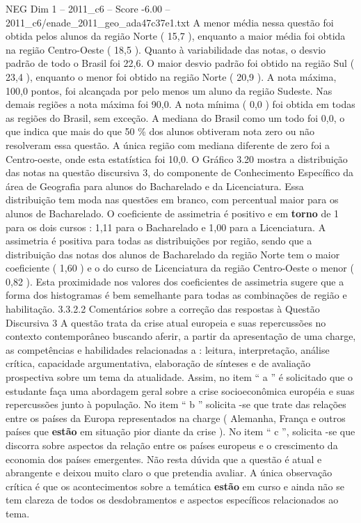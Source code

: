 \begin{textsample}{NEG Dim 1 – 2011\_c6 – Score -6.00 – 2011\_c6/enade\_2011\_geo\_ada47c37e1.txt}
A menor média nessa questão foi obtida pelos alunos da região Norte ( 15,7 ), enquanto a maior média foi obtida na região Centro-Oeste ( 18,5 ).
Quanto à variabilidade das notas, o desvio padrão de todo o Brasil foi 22,6.
O maior desvio padrão foi obtido na região Sul ( 23,4 ), enquanto o menor foi obtido na região Norte ( 20,9 ).
A nota máxima, 100,0 pontos, foi alcançada por pelo menos um aluno da região Sudeste.
Nas demais regiões a nota máxima foi 90,0.
A nota mínima ( 0,0 ) foi obtida em todas as regiões do Brasil, sem exceção.
A mediana do Brasil como um todo foi 0,0, o que indica que mais do que 50 \% dos alunos obtiveram nota zero ou não resolveram essa questão.
A única região com mediana diferente de zero foi a Centro-oeste, onde esta estatística foi 10,0.
O Gráfico 3.20 mostra a distribuição das notas na questão discursiva 3, do componente de Conhecimento Específico da área de Geografia para alunos do Bacharelado e da Licenciatura.
Essa distribuição tem moda nas questões em branco, com percentual maior para os alunos de Bacharelado.
O coeficiente de assimetria é positivo e em \textbf{torno} de 1 para os dois cursos : 1,11 para o Bacharelado e 1,00 para a Licenciatura.
A assimetria é positiva para todas as distribuições por região, sendo que a distribuição das notas dos alunos de Bacharelado da região Norte tem o maior coeficiente ( 1,60 ) e o do curso de Licenciatura da região Centro-Oeste o menor ( 0,82 ).
Esta proximidade nos valores dos coeficientes de assimetria sugere que a forma dos histogramas é bem semelhante para todas as combinações de região e habilitação. 3.3.2.2 Comentários sobre a correção das respostas à Questão Discursiva 3 A questão trata da crise atual europeia e suas repercussões no contexto contemporâneo buscando aferir, a partir da apresentação de uma charge, as competências e habilidades relacionadas a : leitura, interpretação, análise crítica, capacidade argumentativa, elaboração de sínteses e de avaliação prospectiva sobre um tema da atualidade.
Assim, no item “ a ” é solicitado que o estudante faça uma abordagem geral sobre a crise socioeconômica européia e suas repercussões junto à população.
No item “ b ” solicita -se que trate das relações entre os países da Europa representados na charge ( Alemanha, França e outros países que \textbf{estão} em situação pior diante da crise ).
No item “ c ”, solicita -se que discorra sobre aspectos da relação entre os países europeus e o crescimento da economia dos países emergentes.
Não resta dúvida que a questão é atual e abrangente e deixou muito claro o que pretendia avaliar.
A única observação crítica é que os acontecimentos sobre a temática \textbf{estão} em curso e ainda não se tem clareza de todos os desdobramentos e aspectos específicos relacionados ao tema.

\end{textsample}
